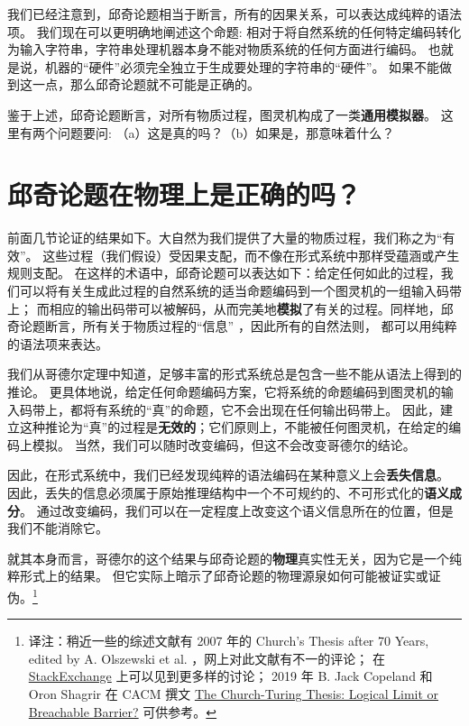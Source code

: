 \documentclass[a4paper,12pt]{article}
\begin{document}
我们已经注意到，邱奇论题相当于断言，所有的因果关系，可以表达成纯粹的语法项。
我们现在可以更明确地阐述这个命题: 相对于将自然系统的任何特定编码转化为输入字符串，字符串处理机器本身不能对物质系统的任何方面进行编码。
也就是说，机器的“硬件”必须完全独立于生成要处理的字符串的“硬件”。 如果不能做到这一点，那么邱奇论题就不可能是正确的。

鉴于上述，邱奇论题断言，对所有物质过程，图灵机构成了一类\textbf{通用模拟器}。 这里有两个问题要问: （a）这是真的吗？（b）如果是，那意味着什么？

\section{邱奇论题在物理上是正确的吗？}

前面几节论证的结果如下。大自然为我们提供了大量的物质过程，我们称之为“有效”。
这些过程（我们假设）受因果支配，而不像在形式系统中那样受蕴涵或产生规则支配。
在这样的术语中，邱奇论题可以表达如下：给定任何如此的过程，我们可以将有关生成此过程的自然系统的适当命题编码到一个图灵机的一组输入码带上；
而相应的输出码带可以被解码，从而完美地\textbf{模拟}了有关的过程。同样地，邱奇论题断言，所有关于物质过程的“信息” ，因此所有的自然法则，
都可以用纯粹的语法项来表达。

我们从哥德尔定理中知道，足够丰富的形式系统总是包含一些不能从语法上得到的推论。
更具体地说，给定任何命题编码方案，它将系统的命题编码到图灵机的输入码带上，都将有系统的“真”的命题，它不会出现在任何输出码带上。
因此，建立这种推论为“真”的过程是\textbf{无效的}；它们原则上，不能被任何图灵机，在给定的编码上模拟。
当然，我们可以随时改变编码，但这不会改变哥德尔的结论。

因此，在形式系统中，我们已经发现纯粹的语法编码在某种意义上会\textbf{丢失信息}。
因此，丢失的信息必须属于原始推理结构中一个不可规约的、不可形式化的\textbf{语义成分}。
通过改变编码，我们可以在一定程度上改变这个语义信息所在的位置，但是我们不能消除它。

就其本身而言，哥德尔的这个结果与邱奇论题的\textbf{物理}真实性无关，因为它是一个纯粹形式上的结果。
但它实际上暗示了邱奇论题的物理源泉如何可能被证实或证伪。\footnote[1]{
译注：稍近一些的综述文献有 2007 年的 Church's Thesis after 70 Years, edited by A. Olszewski et al. ，网上对此文献有不一的评论；
在 \href{https://cstheory.stackexchange.com/questions/88/what-would-it-mean-to-disprove-church-turing-thesis}{StackExchange} 上可以见到更多样的讨论；
2019 年 B. Jack Copeland 和 Oron Shagrir 在 CACM 撰文 \href{https://cacm.acm.org/magazines/2019/1/233526-the-church-turing-thesis/fulltext}{The Church-Turing Thesis: Logical Limit or Breachable Barrier?} 可供参考。}
\end{document}

